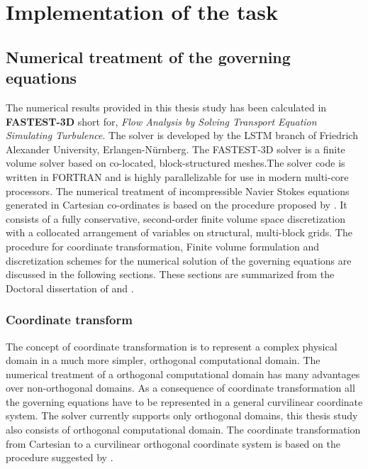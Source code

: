 %
% 


\chapter{Implementation of the task}
\label{sec:implementation}

\section{Numerical treatment of the governing equations}
The numerical results provided in this thesis study has been calculated in \textbf{FASTEST-3D} short for, \textit{Flow Analysis by Solving Transport Equation Simulating Turbulence}. The solver is developed by the LSTM branch of Friedrich Alexander University, Erlangen-Nürnberg. The FASTEST-3D solver is a finite volume solver based on co-located, block-structured meshes.The solver code is written in FORTRAN and is highly parallelizable for use in modern multi-core processors. The numerical treatment of incompressible Navier Stokes equations generated in Cartesian co-ordinates is based on the procedure proposed by \citet{peric1985finite}. It consists of a fully conservative, second-order finite volume space discretization with a collocated arrangement of variables on structural, multi-block grids. The procedure for coordinate transformation, Finite volume formulation and discretization schemes for the numerical solution of the governing equations are discussed in the following sections. These sections are summarized from the Doctoral dissertation of \citet{kumar2005modeling} and \citet{munsch2015entwicklung}.

\subsection{Coordinate transform}
The concept of coordinate transformation is to represent a complex physical domain in a much more simpler, orthogonal computational domain. The numerical treatment of a orthogonal computational domain has many advantages over non-orthogonal domains. As a consequence of coordinate transformation all the governing equations have to be represented in a general curvilinear coordinate system. The solver currently supports only orthogonal domains, this thesis study also consists of orthogonal computational domain. The coordinate transformation from Cartesian to a curvilinear orthogonal coordinate system is based on the procedure suggested by \citet{durst2008fluid}. 

